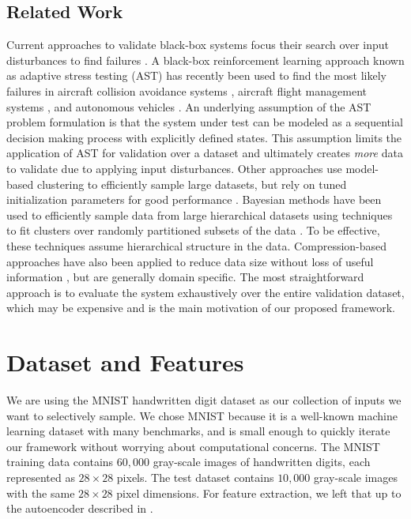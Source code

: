 \subsection{Related Work}
Current approaches to validate black-box systems focus their search over input disturbances to find failures \citep{corso2020survey}.
A black-box reinforcement learning approach known as adaptive stress testing (AST) has recently been used to find the most likely failures in aircraft collision avoidance systems \citep{lee2015adaptive, lee2018adaptive}, aircraft flight management systems \citep{moss2020adaptive}, and autonomous vehicles \citep{koren2018adaptive, koren2019efficient}.
An underlying assumption of the AST problem formulation is that the system under test can be modeled as a sequential decision making process with explicitly defined states.
This assumption limits the application of AST for validation over a dataset and ultimately creates \textit{more} data to validate due to applying input disturbances.
Other approaches use model-based clustering to efficiently sample large datasets, but rely on tuned initialization parameters for good performance \citep{wehrens2004model}.
Bayesian methods have been used to efficiently sample data from large hierarchical datasets using techniques to fit clusters over randomly partitioned subsets of the data \citep{huang2005sampling}.
To be effective, these techniques assume hierarchical structure in the data. 
Compression-based approaches have also been applied to reduce data size without loss of useful information \citep{ferrari2013handling}, but are generally domain specific.
The most straightforward approach is to evaluate the system exhaustively over the entire validation dataset, which may be expensive and is the main motivation of our proposed framework.



\section{Dataset and Features}
We are using the MNIST handwritten digit dataset \citep{lecun2010mnist} as our collection of inputs we want to selectively sample.
We chose MNIST because it is a well-known machine learning dataset with many benchmarks, and is small enough to quickly iterate our framework without worrying about computational concerns.
The MNIST training data contains $60{,}000$ gray-scale images of handwritten digits, each represented as $28\times28$ pixels. The test dataset contains $10{,}000$ gray-scale images with the same $28\times28$ pixel dimensions. For feature extraction, we left that up to the autoencoder described in .



